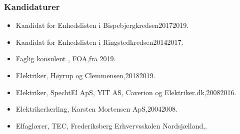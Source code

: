 \documentclass[11pt, a4paper]{awesome-cv}
\begin{document}
\begin{cvletter}
\subsubsection*{Kandidaturer}
\begin{itemize}
\item Kandidat for Enhedslisten i Bispebjergkredsen20172019.
\item Kandidat for Enhedslisten i Ringstedkredsen20142017.
\end{itemize}
\begin{itemize}
\item Faglig konsulent , FOA,fra 2019.
\item Elektriker, Høyrup og Clemmensen,20182019.
\item Elektriker, SpechtEl ApS, YIT AS, Caverion og Elektriker.dk,20082016.
\item Elektrikerlærling, Karsten Mortensen ApS,20042008.
\item Elfaglærer, TEC, Frederiksberg Erhvervsskolen Nordsjælland,.
\end{itemize}
\end{cvletter}
\end{document}
